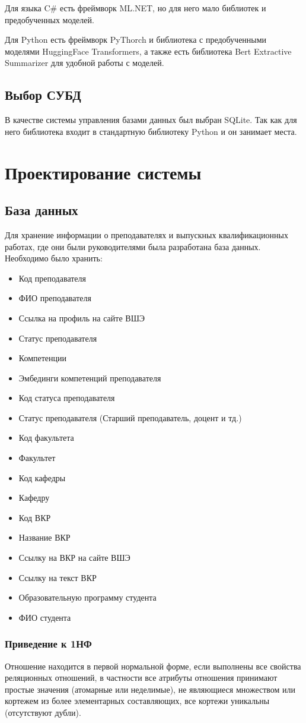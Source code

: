 \documentclass[PI,KR]{HSEUniversity}
\begin{document}
Для языка C\# есть фреймворк ML.NET, но для него мало библиотек и предобученных моделей.

Для Python есть фреймворк PyThorch и библиотека с предобученными моделями HuggingFace Transformers, а также есть библиотека Bert Extractive Summarizer \cite{miller2019leveraging}для удобной работы с моделей.

\section{Выбор СУБД}
В качестве системы управления базами данных был выбран SQLite. Так как для него библиотека входит в стандартную библиотеку Python и он занимает места.
\chapter{Проектирование системы}
\section{База данных}
Для хранение информации о преподавателях и выпускных квалификационных работах, где они были руководителями была разработана база данных. Необходимо было хранить:
\begin{itemize}
	\item Код преподавателя
	\item ФИО преподавателя
	\item Ссылка на профиль на сайте ВШЭ	
	\item Статус преподавателя
	\item Компетенции
	\item Эмбединги компетенций преподавателя
	\item Код статуса преподавателя
	\item Статус преподавателя (Старший преподаватель, доцент и тд.)
	\item Код факультета
	\item Факультет
	\item Код кафедры
	\item Кафедру
	\item Код ВКР
	\item Название ВКР
	\item Ссылку на ВКР на сайте ВШЭ
	\item Ссылку на текст ВКР
	\item Образовательную программу студента
	\item ФИО студента
\end{itemize} 
\subsection{Приведение к 1НФ}
Отношение находится в первой нормальной форме, если выполнены все свойства реляционных отношений, в частности все атрибуты отношения принимают простые значения (атомарные или неделимые), не являющиеся множеством или кортежем из более элементарных составляющих, все кортежи уникальны (отсутствуют дубли).
\end{document}
